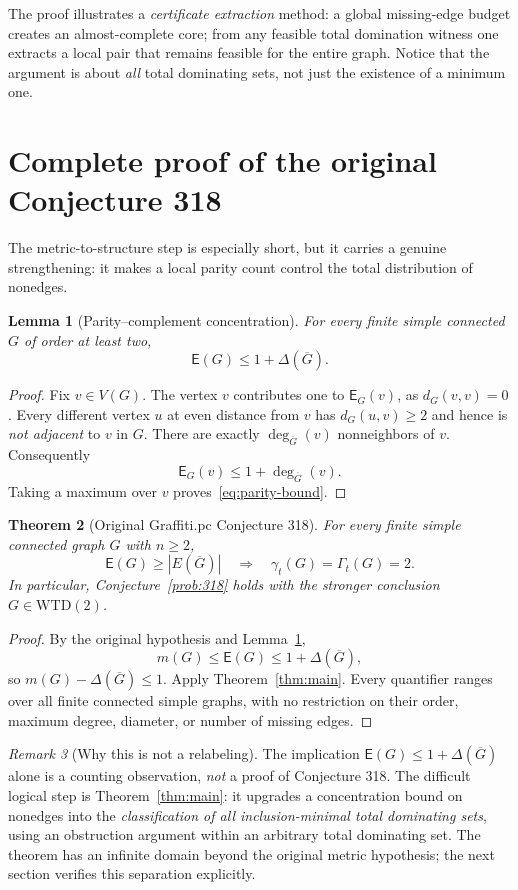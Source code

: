\documentclass[11pt,a4paper]{article}
\newtheorem{theorem}{Theorem}[section]
\newtheorem{lemma}[theorem]{Lemma}
\theoremstyle{definition}\newtheorem{definition}[theorem]{Definition}
\theoremstyle{remark}\newtheorem{remark}[theorem]{Remark}
\newcommand{\Gbar}{\overline G}
\newcommand{\epar}{\mathsf E}
\newcommand{\V}{V(G)}
\newcommand{\WTD}{\mathrm{WTD}}
\begin{document}
The proof illustrates a \emph{certificate extraction} method: a global missing-edge budget creates an almost-complete core; from any feasible total domination witness one extracts a local pair that remains feasible for the entire graph. Notice that the argument is about \emph{all} total dominating sets, not just the existence of a minimum one.

\section{Complete proof of the original Conjecture 318}
The metric-to-structure step is especially short, but it carries a genuine strengthening: it makes a local parity count control the total distribution of nonedges.

\begin{lemma}[Parity--complement concentration]\label{lem:parity}
For every finite simple connected $G$ of order at least two,
\begin{equation}\label{eq:parity-bound}
\epar(G)\le1+\Delta(\Gbar).
\end{equation}
\end{lemma}
\begin{proof}
Fix $v\in\V$. The vertex $v$ contributes one to $\epar_G(v)$, as $d_G(v,v)=0$. Every different vertex $u$ at even distance from $v$ has $d_G(u,v)\ge2$ and hence is \emph{not adjacent} to $v$ in $G$. There are exactly $\deg_{\Gbar}(v)$ nonneighbors of $v$. Consequently
\[\epar_G(v)\le1+\deg_{\Gbar}(v).\]
Taking a maximum over $v$ proves~\eqref{eq:parity-bound}.
\end{proof}

\begin{theorem}[Original Graffiti.pc Conjecture 318]\label{thm:318}
For every finite simple connected graph $G$ with $n\ge2$,
\[
\epar(G)\ge|E(\Gbar)|\quad\Longrightarrow\quad
\gamma_t(G)=\Gamma_t(G)=2.
\]
In particular, Conjecture~\ref{prob:318} holds with the stronger conclusion $G\in\WTD(2)$.
\end{theorem}
\begin{proof}
By the original hypothesis and Lemma~\ref{lem:parity},
\[m(G)\le\epar(G)\le1+\Delta(\Gbar),\]
so $m(G)-\Delta(\Gbar)\le1$. Apply Theorem~\ref{thm:main}. Every quantifier ranges over all finite connected simple graphs, with no restriction on their order, maximum degree, diameter, or number of missing edges.
\end{proof}

\begin{remark}[Why this is not a relabeling]
The implication $\epar(G)\le1+\Delta(\Gbar)$ alone is a counting observation, \emph{not} a proof of Conjecture 318. The difficult logical step is Theorem~\ref{thm:main}: it upgrades a concentration bound on nonedges into the \emph{classification of all inclusion-minimal total dominating sets}, using an obstruction argument within an arbitrary total dominating set. The theorem has an infinite domain beyond the original metric hypothesis; the next section verifies this separation explicitly.
\end{remark}
\end{document}
